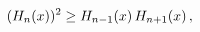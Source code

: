 \[(\mathop{H_{n}\/}\nolimits\!\left(x\right))^{2}\geq\mathop{H_{n-1}\/}\nolimits%
\!\left(x\right)\mathop{H_{n+1}\/}\nolimits\!\left(x\right),\]